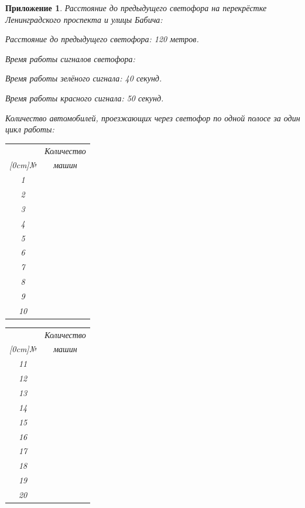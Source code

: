 \documentclass[12pt, a4paper]{extarticle}
\numberwithin{equation}{section}
\newtheorem{attachment}{\hspace{12cm}  Приложение}
\numberwithin{figure}{section}
\begin{document}
\begin{attachment}
\noindent\textup{Расстояние до предыдущего светофора на перекрёстке Ленинградского проспекта и улицы Бабича:}

Расстояние до предыдущего светофора: 120 метров.

\noindent\textup{Время работы сигналов светофора:}

Время работы зелёного сигнала: 40 секунд.

Время работы красного сигнала: 50 секунд.

\noindent\textup{Количество автомобилей, проезжающих через светофор по одной полосе за один цикл работы:}

\begin{table}[h!]
	\begin{minipage}{0.23\linewidth}
		
		\centering
		\begin{tabular}{|c|c|}
			\hline
			& Количество \\ 
			\raisebox{1.5ex}[0cm]{№}
			& машин 
			\\\hline
			1 & 
			\\\hline
			2 & 
			\\\hline
			3 & 
			\\\hline
			4 & 
			\\\hline
			5 & 
			\\\hline
			6 & 
			\\\hline
			7 & 
			\\\hline
			8 & 
			\\\hline
			9 & 
			\\\hline
			10 & 
			\\\hline
		\end{tabular}
	\end{minipage}
	\begin{minipage}{0.23\linewidth}
		\centering
		
		\begin{tabular}{|c|c|}
			\hline
			& Количество \\ 
			\raisebox{1.5ex}[0cm]{№}
			& машин  
			\\\hline
			11 & 
			\\\hline
			12 & 
			\\\hline
			13 & 
			\\\hline
			14 & 
			\\\hline
			15 & 
			\\\hline
			16 & 
			\\\hline
			17 & 
			\\\hline
			18 & 
			\\\hline
			19 & 
			\\\hline
			20 & 
			\\\hline
		\end{tabular}
	\end{minipage} 
	\begin{minipage}{0.23\linewidth}
		\centering
		

\end{minipage}
\end{table}
\end{attachment}
\end{document}
